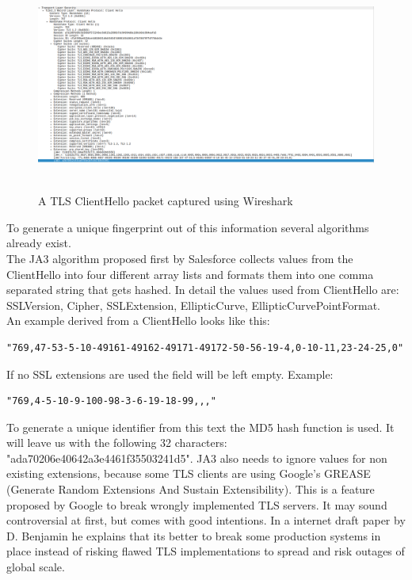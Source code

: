 \documentclass[12pt]{scrbook}
\begin{document}
\begin{figure}[!htb]
    \centering
    \includegraphics[height=7cm]{./images/tls_client_hello_wireshark.png}
    \caption{A TLS ClientHello packet captured using Wireshark}
\end{figure}

To generate a unique fingerprint out of this information several algorithms
already
exist.\\The JA3 algorithm proposed first by Salesforce \cite{ja3Salesforce}
collects values from the ClientHello into four different array lists and formats
them into one comma separated string that gets hashed. In detail the values used
from ClientHello are: SSLVersion, Cipher, SSLExtension, EllipticCurve,
EllipticCurvePointFormat.\\An example derived from a ClientHello looks like
this:
\begin{verbatim}
"769,47-53-5-10-49161-49162-49171-49172-50-56-19-4,0-10-11,23-24-25,0"
\end{verbatim}
If no SSL extensions are used the field will be left empty. Example:
\begin{verbatim}
"769,4-5-10-9-100-98-3-6-19-18-99,,,"
\end{verbatim}
To generate a unique identifier from this text the MD5 hash function is used.
It will leave us with the following 32 characters:
"ada70206e40642a3e4461f35503241d5". JA3 also needs to ignore values for non
existing extensions, because some TLS clients are using Google’s GREASE
(Generate Random Extensions And Sustain Extensibility). This is a feature
proposed by Google to break wrongly implemented TLS servers. It may sound
controversial at first, but comes with good intentions. In a internet draft
paper by D. Benjamin \cite{greaseDraft} he explains that its better to break
some production systems in place instead of risking flawed TLS
implementations to spread and risk outages of global scale.
\end{document}
